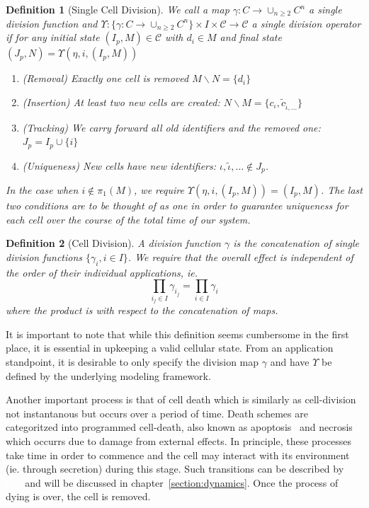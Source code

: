 \documentclass{article}
\newcommand{\todo}[1]{\colorbox{WildStrawberry}{\textcolor{white}{#1}}}
\newtheorem{definition}{Definition}[section]
\begin{document}
\begin{definition}[Single Cell Division]
    \label{definition:cell-division-single}
    We call a map $\gamma:C\rightarrow \cup_{n\geq 2}C^n$ a single division function and
    $\Upsilon:\{\gamma:C\rightarrow \cup_{n\geq 2}C^n\}\times I\times\mathscr{C}\rightarrow\mathscr{C}$ a 
    single division operator if for any initial state $(I_p,M)\in\mathscr{C}$ with $d_i\in M$ and
    final state $(J_p,N)=\Upsilon(\eta,i,(I_p,M))$
    \begin{enumerate}
        \item (Removal) Exactly one cell is removed $M\backslash N=\{d_i\}$
        \item (Insertion) At least two new cells are created:
            $N\backslash M=\{c_\iota,\tilde{c}_{\tilde{\iota},\dots}\}$
        \item (Tracking) We carry forward all old identifiers and the removed one: $J_p=I_p\cup\{i\}$
        \item (Uniqueness) New cells have new identifiers: $\iota,\tilde{\iota},\dots\notin J_p$.
    \end{enumerate}
    In the case when $i\notin\pi_1(M)$, we require $\Upsilon(\eta,i,(I_p,M))=(I_p,M)$.
    The last two conditions are to be thought of as one in order to guarantee uniqueness for each
    cell over the course of the total time of our system.
\end{definition}

\begin{definition}[Cell Division]
    \label{definition:cell-division}
    A division function $\gamma$ is the concatenation of single division functions
    $\{\gamma_i,i\in I\}$.
    We require that the overall effect is independent of the order of their individual applications,
    ie.
    \begin{equation}
        \prod\limits_{i_j\in I}\gamma_{i_j} = \prod\limits_{i\in I}\gamma_i
    \end{equation}
    where the product is with respect to the concatenation of maps.
\end{definition}

It is important to note that while this definition seems cumbersome in the first place, it is
essential in upkeeping a valid cellular state.
From an application standpoint, it is desirable to only specify the division map $\gamma$ and have
$\Upsilon$ be defined by the underlying modeling framework.

Another important process is that of cell death which is similarly as cell-division not instantanous
but occurs over a period of time.
Death schemes are categoritzed into programmed cell-death, also known as apoptosis~\cite{Kerr1965}
and necrosis~\cite{Gerschenson2001} which occurrs due to damage from external effects.
In principle, these processes take time in order to commence and the cell may interact with its
environment (ie. through secretion) during this stage.
Such transitions can be described by \todo{fill this} and will be discussed in
chapter~\ref{section:dynamics}.
Once the process of dying is over, the cell is removed.
\end{document}
